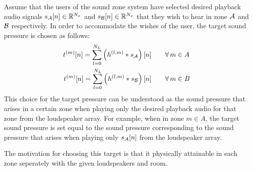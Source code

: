 Assume that the users of the sound zone system have selected desired playback audio signals $s_{\mathcal{A}}[n]\in\mathbb{R}^{N_x}$ and
$s_{\mathcal{B}}[n]\in\mathbb{R}^{N_x}$ that they wish to hear in zone $\mathcal{A}$ and $\mathcal{B}$ respectively.
In order to accommodate the wishes of the user, the target sound pressure is chosen as follows: 
\begin{align}
    \begin{aligned}
        t^{(m)}[n] = \sum_{l=0}^{N_L} \left(h^{(l,m)} \ast s_{\mathcal{A}}\right)[n]\qquad &\forall\,m\in A\\
        t^{(m)}[n] = \sum_{l=0}^{N_L} \left(h^{(l,m)} \ast s_{\mathcal{B}}\right)[n]\qquad &\forall\,m\in B
    \end{aligned}
    \label{eq:sound_zone:data_model:target_pressure}
\end{align}
This choice for the target pressure can be understood as the sound pressure that arises in a certain zone
when playing only the desired playback audio for that zone from the loudspeaker array. 
For example, when in zone $m\in A$, the target sound pressure is set equal to the sound pressure corresponding to 
the sound pressure that arises when playing only $s_{\mathcal{A}}[n]$ from the loudspeaker array.

The motivation for choosing this target is that it physically attainable in each zone seperately
with the given loudspeakers and room.

